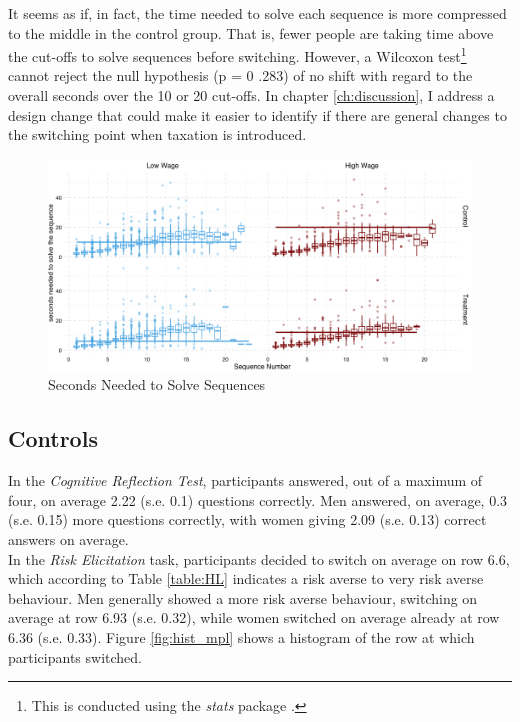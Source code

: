 It seems as if, in fact, the time needed to solve each sequence is more compressed to the middle in the control group. That is, fewer people are taking time above the cut-offs to solve sequences before switching. However, a Wilcoxon test\footnote{This is conducted using the \textit{stats} package \cite{rcoreteam2014}.} cannot reject the null hypothesis (p = 0 .283) of no shift with regard to the overall seconds over the 10 or 20 cut-offs. In chapter \ref{ch:discussion}, I address a design change that could make it easier to identify if there are general changes to the switching point when taxation is introduced.\\

\begin{figure}
    \centering
    \includegraphics[width=\textwidth]{graphs/time_task_grid.png}
    \caption{Seconds Needed to Solve Sequences}
    \label{fig:time_per_task}
\end{figure}

\subsection{Controls}

In the \textit{Cognitive Reflection Test}, participants answered, out of a maximum of four, on average 2.22 (s.e. 0.1) questions correctly. Men answered, on average, 0.3 (s.e. 0.15) more questions correctly, with women giving 2.09 (s.e. 0.13) correct answers on average.\\

In the \textit{Risk Elicitation} task, participants decided to switch on average on row 6.6, which according to Table \ref{table:HL} indicates a risk averse to very risk averse behaviour. Men generally showed a more risk averse behaviour, switching on average at row 6.93 (s.e. 0.32), while women switched on average already at row 6.36 (s.e. 0.33). Figure \ref{fig:hist_mpl} shows a histogram of the row at which participants switched.\\

